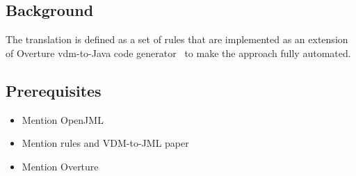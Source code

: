 \subsection{Background}

The translation is defined as a set of rules that are implemented as
an extension of Overture \ac{vdm}-to-Java code
generator~\cite{Jorgensen&14a} to make the approach fully automated.

\subsection{Prerequisites}

\begin{itemize}
\item Mention OpenJML
\item Mention rules and VDM-to-JML paper
\item Mention Overture
\end{itemize}

